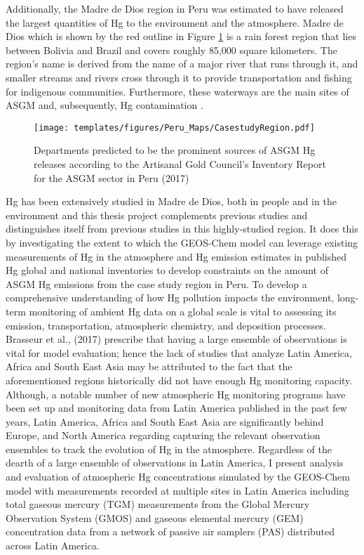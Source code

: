 \begin{flushleft}
Additionally, the Madre de Dios region in Peru was estimated to have released the largest quantities of Hg to the environment and the atmosphere\cite{agc_reporte_2017}. Madre de Dios which is shown by the red outline in Figure \ref{fig:PeruCS} is a rain forest region that lies between Bolivia and Brazil and covers roughly 85,000 square kilometers. The region's name is derived from the name of a major river that runs through it, and smaller streams and rivers cross through it to provide transportation and fishing for indigenous communities. Furthermore, these waterways are the main sites of ASGM and, subsequently, Hg contamination \cite{ashe_elevated_2012,agc_reporte_2017}. 
\begin{figure}[H]
  \texttt{[image: templates/figures/Peru\_Maps/CasestudyRegion.pdf]}
  \centering
  \caption{Departments predicted to be the prominent sources of ASGM Hg releases according to the Artisanal Gold Council's  Inventory Report for the ASGM sector in Peru (2017) }
  \label{fig:PeruCS}
\end{figure}
\FloatBarrier

Hg has been extensively studied in Madre de Dios, both in people and in the environment and this thesis project complements previous studies and distinguishes itself from previous studies in this highly-studied region. It does this by investigating the extent to which the GEOS-Chem model can leverage existing measurements of Hg in the atmosphere and Hg emission estimates in published Hg global and national inventories to develop constraints on the amount of ASGM Hg emissions from the case study region in Peru. To develop a comprehensive understanding of how Hg pollution impacts the environment, long-term monitoring of ambient Hg data on a global scale is vital to assessing its emission, transportation, atmospheric chemistry, and deposition processes. Brasseur et al., (2017) prescribe that having a large ensemble of observations is vital for model evaluation; hence the lack of studies that analyze Latin America, Africa and South East Asia may be attributed to the fact that the aforementioned regions historically did not have enough Hg monitoring capacity. Although, a notable number of new atmospheric Hg monitoring programs have been set up and monitoring data from Latin America published in the past few years, Latin America, Africa and South East Asia are significantly behind Europe, and North America regarding capturing the relevant observation ensembles to track the evolution of Hg in the atmosphere. Regardless of the dearth of a large ensemble  of observations in Latin America, I present analysis and evaluation of atmospheric Hg concentrations simulated by the GEOS-Chem model with measurements recorded at multiple sites in Latin America including total gaseous mercury (TGM) measurements from the Global Mercury Observation System (GMOS) and gaseous elemental mercury (GEM) concentration data from a network of passive air samplers (PAS) distributed across Latin America. 

\end{flushleft}
